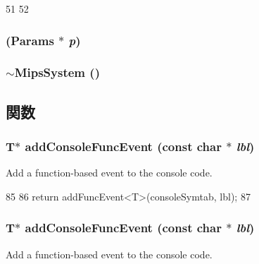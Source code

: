 \begin{DoxyCode}
51 {
52 }
\end{DoxyCode}
\hypertarget{classMipsSystem_a62dbd286dd7ffc15d71da3c22bfafe7a}{
\subsubsection[{MipsSystem}]{ ({\bf Params} $\ast$ {\em p})}}
\label{classMipsSystem_a62dbd286dd7ffc15d71da3c22bfafe7a}
\hypertarget{classMipsSystem_a325a17b3fbc7b08bfa6b90e3e2be0253}{
\subsubsection[{$\sim$MipsSystem}]{\setlength{\rightskip}{0pt plus 5cm}$\sim${\bf MipsSystem} ()}}
\label{classMipsSystem_a325a17b3fbc7b08bfa6b90e3e2be0253}


\subsection{関数}
\hypertarget{classMipsSystem_a144f0e3cc56a01c7425853cc5ad44021}{
\subsubsection[{addConsoleFuncEvent}]{\setlength{\rightskip}{0pt plus 5cm}T$\ast$ addConsoleFuncEvent (const char $\ast$ {\em lbl})}}
\label{classMipsSystem_a144f0e3cc56a01c7425853cc5ad44021}
Add a function-\/based event to the console code. 


\begin{DoxyCode}
85     {
86         return addFuncEvent<T>(consoleSymtab, lbl);
87     }
\end{DoxyCode}
\hypertarget{classMipsSystem_a144f0e3cc56a01c7425853cc5ad44021}{
\subsubsection[{addConsoleFuncEvent}]{\setlength{\rightskip}{0pt plus 5cm}T$\ast$ addConsoleFuncEvent (const char $\ast$ {\em lbl})}}
\label{classMipsSystem_a144f0e3cc56a01c7425853cc5ad44021}
Add a function-\/based event to the console code. 


